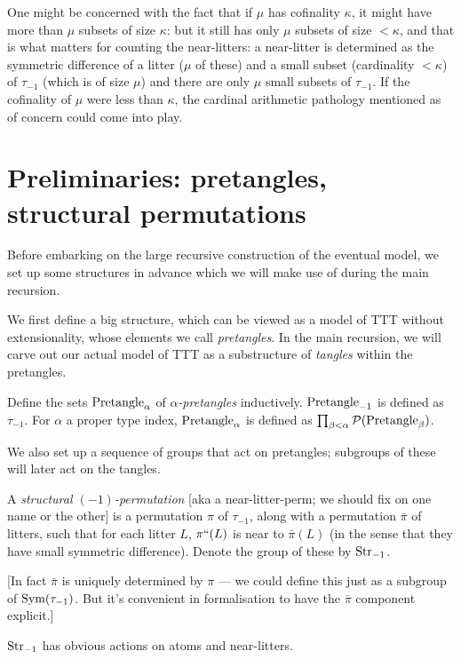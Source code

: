 One might be concerned with the fact that if $\mu$ has cofinality $\kappa$, it might have more than $\mu$ subsets of size $\kappa$:  but it still has only $\mu$ subsets of size $<\kappa$, and that is what matters for counting the near-litters:  a near-litter is determined as the symmetric difference of a litter ($\mu$ of these) and a small subset (cardinality $<\kappa$) of $\tau_{-1}$ (which is of size $\mu$) and there are only $\mu$ small subsets of $\tau_{-1}$.  If the cofinality of $\mu$ were less than $\kappa$, the cardinal arithmetic pathology mentioned as of concern could come into play.

\section{Preliminaries: pretangles, structural permutations}

Before embarking on the large recursive construction of the eventual model, we set up some structures in advance which we will make use of during the main recursion.

We first define a big structure, which can be viewed as a model of TTT without extensionality, whose elements we call \emph{pretangles}.  In the main recursion, we will carve out our actual model of TTT as a substructure of \emph{tangles} within the pretangles.

\begin{definition}
  \label{def:pretangle}
  \leanok
  Define the sets $\mathrm{Pretangle}_\alpha$ of \emph{$\alpha$-pretangles} inductively. $\mathrm{Pretangle}_{-1}$ is defined as $\tau_{-1}$. For $\alpha$ a proper type index, $\mathrm{Pretangle}_\alpha$ is defined as $\prod_{\beta < \alpha} \mathcal P(\mathrm{Pretangle}_\beta)$.
\end{definition}

We also set up a sequence of groups that act on pretangles; subgroups of these will later act on the tangles.

\begin{definition}
  \label{def:structural-perm-atoms}
  \leanok

  A \emph{structural $(-1)$-permutation} [aka a near-litter-perm; we should fix on one name or the other] is a permutation $\pi$ of $\tau_{-1}$, along with a permutation $\bar{\pi}$ of litters, such that for each litter $L$, $\pi``(L)$ is near to $\bar{\pi}(L)$ (in the sense that they have small symmetric difference).  Denote the group of these by $\mathrm{Str}_{-1}$.

  [In fact $\bar{\pi}$ is uniquely determined by $\pi$ — we could define this just as a subgroup of $\mathrm{Sym}(\tau_{-1})$.  But it’s convenient in formalisation to have the $\bar{\pi}$ component explicit.]

  $\mathrm{Str}_{-1}$ has obvious actions on atoms and near-litters.
\end{definition}

